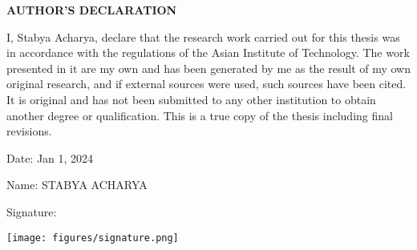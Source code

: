 \begin{center}
    \large{\bf AUTHOR'S DECLARATION}
\end{center}

I, Stabya Acharya, declare that the research work carried out for this thesis was in accordance with the regulations of the Asian Institute of Technology. The work presented in it are my own and has been generated by me as the result of my own original research, and if external sources were used, such sources have been cited. It is original and has not been submitted to any other institution to obtain another degree or qualification. This is a true copy of the thesis including final revisions.

Date: Jan 1, 2024

Name: STABYA ACHARYA


Signature: 

\vspace{-3em}\hspace{5.5em}\texttt{[image: figures/signature.png]}

